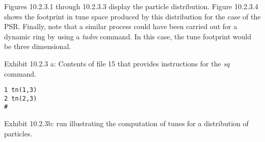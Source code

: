 Figures 10.2.3.1 through 10.2.3.3 display the particle distribution.  Figure 10.2.3.4 shows the footprint in tune space produced by this distribution for the case of the PSR.  Finally, note that a similar process could have been carried out for a dynamic ring by using a {\em tadm} command.  In this case, the tune footprint would be three dimensional.


\vspace{.25in}
\noindent Exhibit 10.2.3 a: Contents of file 15 that provides instructions for the {\em sq} command.
\begin{footnotesize}
\begin{verbatim}
1 tn(1,3)
2 tn(2,3)
#
\end{verbatim}
\end{footnotesize}

\vspace{.25in}
\noindent Exhibit 10.2.3b: \Mary run illustrating the computation of tunes for a distribution of particles.
